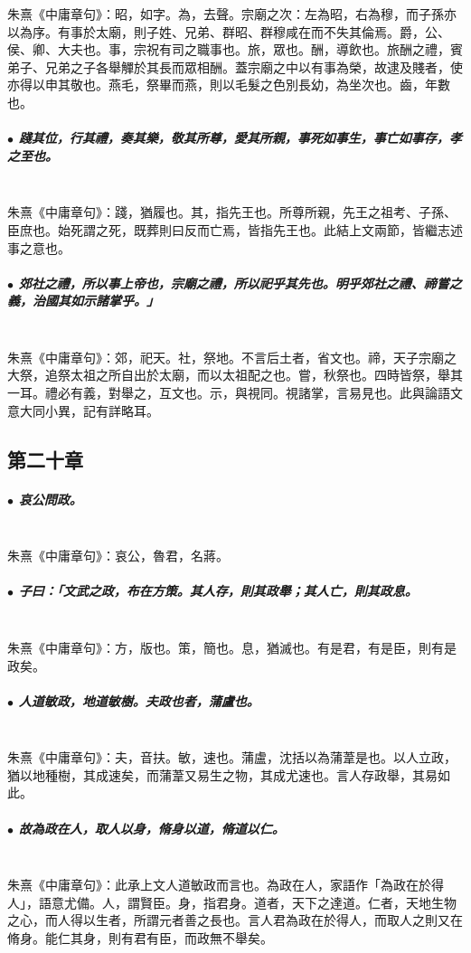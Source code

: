 \documentclass[hyperref, UTF8, 12pt, a4paper]{ctexrep}
\begin{document}
朱熹《中庸章句》：昭，如字。為，去聲。宗廟之次：左為昭，右為穆，而子孫亦以為序。有事於太廟，則子姓、兄弟、群昭、群穆咸在而不失其倫焉。爵，公、侯、卿、大夫也。事，宗祝有司之職事也。旅，眾也。酬，導飲也。旅酬之禮，賓弟子、兄弟之子各舉觶於其長而眾相酬。蓋宗廟之中以有事為榮，故逮及賤者，使亦得以申其敬也。燕毛，祭畢而燕，則以毛髮之色別長幼，為坐次也。齒，年數也。

\subparagraph{$\bullet$ 踐其位，行其禮，奏其樂，敬其所尊，愛其所親，事死如事生，事亡如事存，孝之至也。} ~\\

朱熹《中庸章句》：踐，猶履也。其，指先王也。所尊所親，先王之祖考、子孫、臣庶也。始死謂之死，既葬則曰反而亡焉，皆指先王也。此結上文兩節，皆繼志述事之意也。

\subparagraph{$\bullet$ 郊社之禮，所以事上帝也，宗廟之禮，所以祀乎其先也。明乎郊社之禮、禘嘗之義，治國其如示諸掌乎。」} ~\\

朱熹《中庸章句》：郊，祀天。社，祭地。不言后土者，省文也。禘，天子宗廟之大祭，追祭太祖之所自出於太廟，而以太祖配之也。嘗，秋祭也。四時皆祭，舉其一耳。禮必有義，對舉之，互文也。示，與視同。視諸掌，言易見也。此與論語文意大同小異，記有詳略耳。

\newpage
\subsection{第二十章}

\subparagraph{$\bullet$ 哀公問政。} ~\\

朱熹《中庸章句》：哀公，魯君，名蔣。

\subparagraph{$\bullet$ 子曰：「文武之政，布在方策。其人存，則其政舉；其人亡，則其政息。} ~\\

朱熹《中庸章句》：方，版也。策，簡也。息，猶滅也。有是君，有是臣，則有是政矣。

\subparagraph{$\bullet$ 人道敏政，地道敏樹。夫政也者，蒲盧也。} ~\\

朱熹《中庸章句》：夫，音扶。敏，速也。蒲盧，沈括以為蒲葦是也。以人立政，猶以地種樹，其成速矣，而蒲葦又易生之物，其成尤速也。言人存政舉，其易如此。

\subparagraph{$\bullet$ 故為政在人，取人以身，脩身以道，脩道以仁。} ~\\

朱熹《中庸章句》：此承上文人道敏政而言也。為政在人，家語作「為政在於得人」，語意尤備。人，謂賢臣。身，指君身。道者，天下之達道。仁者，天地生物之心，而人得以生者，所謂元者善之長也。言人君為政在於得人，而取人之則又在脩身。能仁其身，則有君有臣，而政無不舉矣。
\end{document}
